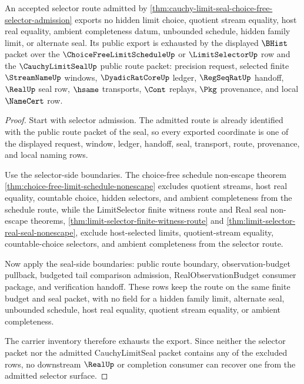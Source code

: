 \begin{theorem}
\label{thm:cauchy-limit-seal-choice-free-selector-nonescape}
An accepted selector route admitted by \autoref{thm:cauchy-limit-seal-choice-free-selector-admission} exports no hidden limit choice, quotient stream equality, host real equality, ambient completeness datum, unbounded schedule, hidden family limit, or alternate seal. Its public export is exhausted by the displayed $\BHist$ packet over the $\ChoiceFreeLimitScheduleUp$ or $\LimitSelectorUp$ row and the $\CauchyLimitSealUp$ public route packet: precision request, selected finite $\StreamNameUp$ windows, $\DyadicRatCoreUp$ ledger, $\RegSeqRatUp$ handoff, $\RealUp$ seal row, $\hsame$ transports, $\Cont$ replays, $\Pkg$ provenance, and local $\NameCert$ row.
\end{theorem}
\begin{proof}
Start with selector admission. The admitted route is already identified with the public route packet of the seal, so every exported coordinate is one of the displayed request, window, ledger, handoff, seal, transport, route, provenance, and local naming rows.

Use the selector-side boundaries. The choice-free schedule non-escape theorem \autoref{thm:choice-free-limit-schedule-nonescape} excludes quotient streams, host real equality, countable choice, hidden selectors, and ambient completeness from the schedule route, while the LimitSelector finite witness route and Real seal non-escape theorems, \autoref{thm:limit-selector-finite-witness-route} and \autoref{thm:limit-selector-real-seal-nonescape}, exclude host-selected limits, quotient-stream equality, countable-choice selectors, and ambient completeness from the selector route.

Now apply the seal-side boundaries: public route boundary, observation-budget pullback, budgeted tail comparison admission, RealObservationBudget consumer package, and verification handoff. These rows keep the route on the same finite budget and seal packet, with no field for a hidden family limit, alternate seal, unbounded schedule, host real equality, quotient stream equality, or ambient completeness.

The carrier inventory therefore exhausts the export. Since neither the selector packet nor the admitted CauchyLimitSeal packet contains any of the excluded rows, no downstream $\RealUp$ or completion consumer can recover one from the admitted selector surface.
\end{proof}

